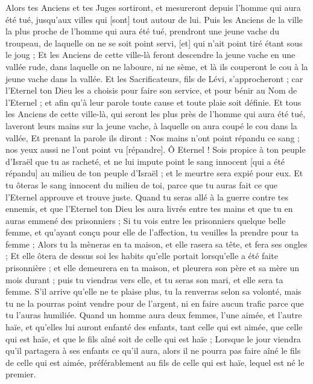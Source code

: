 \begin{multicols}{2}
Alors tes Anciens et tes Juges sortiront, et mesureront depuis l'homme qui aura été tué, jusqu'aux villes qui [sont] tout autour de lui.
Puis les Anciens de la ville la plus proche de l'homme qui aura été tué, prendront une jeune vache du troupeau, de laquelle on ne se soit point servi, [et] qui n'ait point tiré étant sous le joug ;
Et les Anciens de cette ville-là feront descendre la jeune vache en une vallée rude, dans laquelle on ne laboure, ni ne sème, et là ils couperont le cou à la jeune vache dans la vallée.
Et les Sacrificateurs, fils de Lévi, s'approcheront ; car l'Eternel ton Dieu les a choisis pour faire son service, et pour bénir au Nom de l'Eternel ; et afin qu'à leur parole toute cause et toute plaie soit définie.
Et tous les Anciens de cette ville-là, qui seront les plus près de l'homme qui aura été tué, laveront leurs mains sur la jeune vache, à laquelle on aura coupé le cou dans la vallée,
Et prenant la parole ils diront : Nos mains n'ont point répandu ce sang ; nos yeux aussi ne l'ont point vu [répandre].
Ô Eternel ! Sois propice à ton peuple d'Israël que tu as racheté, et ne lui impute point le sang innocent [qui a été répandu] au milieu de ton peuple d'Israël ; et le meurtre sera expié pour eux.
Et tu ôteras le sang innocent du milieu de toi, parce que tu auras fait ce que l'Eternel approuve et trouve juste.
Quand tu seras allé à la guerre contre tes ennemis, et que l'Eternel ton Dieu les aura livrés entre tes mains et que tu en auras emmené des prisonniers ;
Si tu vois entre les prisonniers quelque belle femme, et qu'ayant conçu pour elle de l'affection, tu veuilles la prendre pour ta femme ;
Alors tu la mèneras en ta maison, et elle rasera sa tête, et fera ses ongles ;
Et elle ôtera de dessus soi les habits qu'elle portait lorsqu'elle a été faite prisonnière ; et elle demeurera en ta maison, et pleurera son père et sa mère un mois durant ; puis tu viendras vers elle, et tu seras son mari, et elle sera ta femme.
S'il arrive qu'elle ne te plaise plus, tu la renverras selon sa volonté, mais tu ne la pourras point vendre pour de l'argent, ni en faire aucun trafic parce que tu l'auras humiliée.
Quand un homme aura deux femmes, l'une aimée, et l'autre haïe, et qu'elles lui auront enfanté des enfants, tant celle qui est aimée, que celle qui est haïe, et que le fils aîné soit de celle qui est haïe ;
Lorsque le jour viendra qu'il partagera à ses enfants ce qu'il aura, alors il ne pourra pas faire aîné le fils de celle qui est aimée, préférablement au fils de celle qui est haïe, lequel est né le premier.

\end{multicols}
